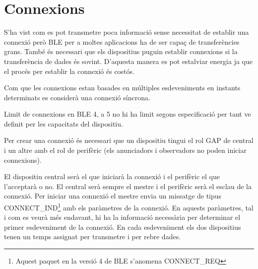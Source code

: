 \begin{figure}[!h]
	\begin{center}
		\begin{subfigmatrix}{1}
		\end{subfigmatrix}
	\end{center}
\end{figure}

\section{Connexions}
S'ha vist com es pot transmetre poca informació sense necessitat de establir una connexió però BLE per a moltes aplicacions ha de ser capaç de transferències grans.
També és necessari que els dispositius puguin establir connexions si la transferència de dades és sovint.
D'aquesta manera es pot estalviar energia ja que el procés per establir la connexió és costós.

Com que les connexions estan basades en múltiples esdeveniments en instants determinats es considerà una connexió síncrona.

Limit de connexions en BLE 4, a 5 no hi ha limit segons especificació per tant ve definit per les capacitats del dispositiu.

Per crear una connexió és necessari que un dispositiu tingui el rol GAP de central i un altre amb el rol de perifèric (els anunciadors i observadors no poden iniciar connexions).

El dispositiu central serà el que iniciarà la connexió i el perifèric el que l'acceptarà o no.
El central serà sempre el mestre i el perifèric serà el esclau de la connexió.
Per iniciar una connexió el mestre envia un missatge de tipus CONNECT\_IND\footnote{Aquest paquet en la versió 4 de BLE s'anomena CONNECT\_REQ} amb els paràmetres de la connexió.
En aquests paràmetres, tal i com es veurà més endavant, hi ha la informació necessària per determinar el primer esdeveniment de la connexió.
En cada esdeveniment els dos dispositius tenen un temps assignat per transmetre i per rebre dades.

